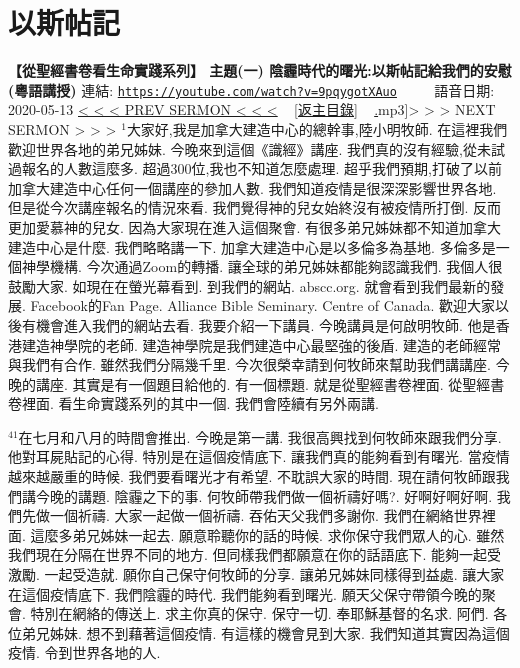 \documentclass{book}
\begin{document}
\section{以斯帖記}
\label{sec:9pqygotXAuo}
\textbf{【從聖經書卷看生命實踐系列】 主題(一) 陰霾時代的曙光:以斯帖記給我們的安慰 (粵語講授)}
\newline
\newline
連結: \href{https://youtube.com/watch?v=9pqygotXAuo}{\texttt{https://youtube.com/watch?v=9pqygotXAuo}} ~~~~ 語音日期: 2020-05-13
\newline
\newline
\hyperref[sec:JwFqk5bcKhM]{\small{< < < PREV SERMON < < <}}
~
\hyperref[sec:index]{\small{[返主目錄]}}
~
\hyperref[sec:t3iF4o].mp3]{\small{> > > NEXT SERMON > > >}}
\newline
\newline
$^{1}$大家好,我是加拿大建造中心的總幹事,陸小明牧師.
在這裡我們歡迎世界各地的弟兄姊妹.
今晚來到這個《識經》講座.
我們真的沒有經驗,從未試過報名的人數這麼多.
超過300位,我也不知道怎麼處理.
超乎我們預期,打破了以前加拿大建造中心任何一個講座的參加人數.
我們知道疫情是很深深影響世界各地.
但是從今次講座報名的情況來看.
我們覺得神的兒女始終沒有被疫情所打倒.
反而更加愛慕神的兒女.
因為大家現在進入這個聚會.
有很多弟兄姊妹都不知道加拿大建造中心是什麼.
我們略略講一下.
加拿大建造中心是以多倫多為基地.
多倫多是一個神學機構.
今次通過Zoom的轉播.
讓全球的弟兄姊妹都能夠認識我們.
我個人很鼓勵大家.
如現在在螢光幕看到.
到我們的網站.
abscc.org.
就會看到我們最新的發展.
Facebook的Fan Page.
Alliance Bible Seminary.
Centre of Canada.
歡迎大家以後有機會進入我們的網站去看.
我要介紹一下講員.
今晚講員是何啟明牧師.
他是香港建造神學院的老師.
建造神學院是我們建造中心最堅強的後盾.
建造的老師經常與我們有合作.
雖然我們分隔幾千里.
今次很榮幸請到何牧師來幫助我們講講座.
今晚的講座.
其實是有一個題目給他的.
有一個標題.
就是從聖經書卷裡面.
從聖經書卷裡面.
看生命實踐系列的其中一個.
我們會陸續有另外兩講.

$^{41}$在七月和八月的時間會推出.
今晚是第一講.
我很高興找到何牧師來跟我們分享.
他對耳屍貼記的心得.
特別是在這個疫情底下.
讓我們真的能夠看到有曙光.
當疫情越來越嚴重的時候.
我們要看曙光才有希望.
不耽誤大家的時間.
現在請何牧師跟我們講今晚的講題.
陰霾之下的事.
何牧師帶我們做一個祈禱好嗎?.
好啊好啊好啊.
我們先做一個祈禱.
大家一起做一個祈禱.
吞佑天父我們多謝你.
我們在網絡世界裡面.
這麼多弟兄姊妹一起去.
願意聆聽你的話的時候.
求你保守我們眾人的心.
雖然我們現在分隔在世界不同的地方.
但同樣我們都願意在你的話語底下.
能夠一起受激勵.
一起受造就.
願你自己保守何牧師的分享.
讓弟兄姊妹同樣得到益處.
讓大家在這個疫情底下.
我們陰霾的時代.
我們能夠看到曙光.
願天父保守帶領今晚的聚會.
特別在網絡的傳送上.
求主你真的保守.
保守一切.
奉耶穌基督的名求.
阿們.
各位弟兄姊妹.
想不到藉著這個疫情.
有這樣的機會見到大家.
我們知道其實因為這個疫情.
令到世界各地的人.
\end{document}
